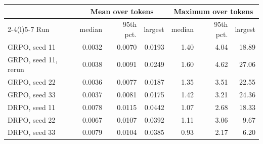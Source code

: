 \begin{tabularx}{\textwidth}{@{}Xrrrrrr@{}}
\toprule
 & \multicolumn{3}{c}{Mean over tokens} & \multicolumn{3}{c}{Maximum over tokens} \\
\cmidrule(lr){2-4}\cmidrule(l){5-7}
Run & median & 95th pct. & largest & median & 95th pct. & largest \\
\midrule
GRPO, seed 11 & 0.0032 & 0.0070 & 0.0193 & 1.40 & 4.04 & 18.89 \\
GRPO, seed 11, rerun & 0.0038 & 0.0091 & 0.0249 & 1.60 & 4.62 & 27.06 \\
GRPO, seed 22 & 0.0036 & 0.0077 & 0.0187 & 1.35 & 3.51 & 22.55 \\
GRPO, seed 33 & 0.0037 & 0.0081 & 0.0175 & 1.42 & 3.21 & 24.36 \\
DRPO, seed 11 & 0.0078 & 0.0115 & 0.0442 & 1.07 & 2.68 & 18.33 \\
DRPO, seed 22 & 0.0067 & 0.0107 & 0.0392 & 1.11 & 3.06 & 9.67 \\
DRPO, seed 33 & 0.0079 & 0.0104 & 0.0385 & 0.93 & 2.17 & 6.20 \\
\bottomrule
\end{tabularx}
